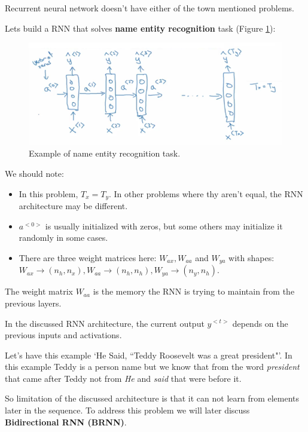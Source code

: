 Recurrent neural network doesn't have either of the town mentioned problems.

Lets build a RNN that solves \textbf{name entity recognition} task (Figure \ref{name-entity}):

\begin{figure}[!htbp]
    \centering
    \includegraphics[width=1.0\textwidth]{img/c5/name-enttity-task.png}
    \caption{Example of name entity recognition task.}
    \label{name-entity}
\end{figure}

We should note:

\begin{itemize}
    \item In this problem, $T_x = T_y$. In other problems where thy aren't equal, the RNN architecture may be different.
    \item $a^{<0>}$ is usually initialized with zeros, but some others may initialize it randomly in some cases.
    \item There are three weight matrices here: $W_{ax}, W_{aa}$ and $W_{ya}$ with shapes: $W_{ax}\to (n_h, n_x), W_{aa}\to (n_h, n_h), W_{ya}\to (n_y, n_h)$.
\end{itemize}

The weight matrix $W_{aa}$ is the memory the RNN is trying to maintain from the previous layers.

In the discussed RNN architecture, the current output $y^{<t>}$ depends on the previous inputs and activations. 

Let's have this example `He Said, ``Teddy Roosevelt was a great president"'. In this example Teddy is a person name but we know that from the word \textit{president} that came after Teddy not from \textit{He} and \textit{said} that were before it.

So limitation of the discussed architecture is that it can not learn from elements later in the sequence. To address this problem we will later discuss \textbf{Bidirectional RNN (BRNN)}.

